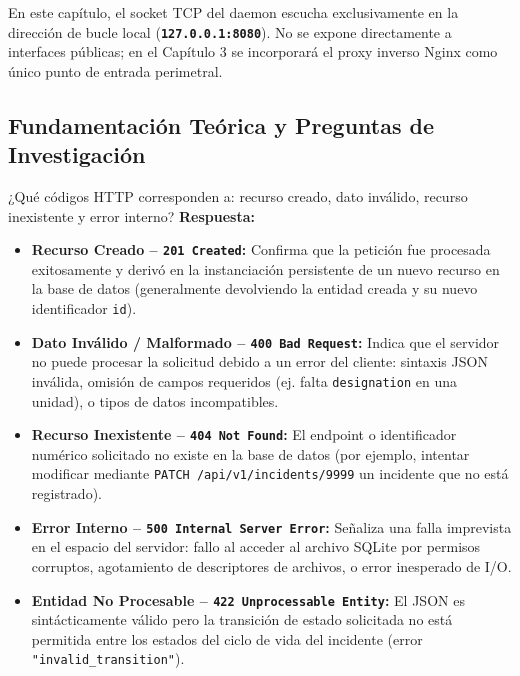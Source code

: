 \documentclass[10pt,a4paper]{article}
\begin{document}
\begin{notabox}
    En este capítulo, el socket TCP del daemon escucha exclusivamente en la dirección de bucle local (\textbf{\texttt{127.0.0.1:8080}}). No se expone directamente a interfaces públicas; en el Capítulo 3 se incorporará el proxy inverso Nginx como único punto de entrada perimetral.
\end{notabox}

\subsection{Fundamentación Teórica y Preguntas de Investigación}

\begin{pregunta}{¿Qué códigos HTTP corresponden a: recurso creado, dato inválido, recurso inexistente y error interno?}
    \textbf{Respuesta:}
    \begin{itemize}[leftmargin=*]
        \item \textbf{Recurso Creado -- \texttt{201 Created}:} Confirma que la petición fue procesada exitosamente y derivó en la instanciación persistente de un nuevo recurso en la base de datos (generalmente devolviendo la entidad creada y su nuevo identificador \texttt{id}).
        \item \textbf{Dato Inválido / Malformado -- \texttt{400 Bad Request}:} Indica que el servidor no puede procesar la solicitud debido a un error del cliente: sintaxis JSON inválida, omisión de campos requeridos (ej. falta \texttt{designation} en una unidad), o tipos de datos incompatibles.
        \item \textbf{Recurso Inexistente -- \texttt{404 Not Found}:} El endpoint o identificador numérico solicitado no existe en la base de datos (por ejemplo, intentar modificar mediante \texttt{PATCH /api/v1/incidents/9999} un incidente que no está registrado).
        \item \textbf{Error Interno -- \texttt{500 Internal Server Error}:} Señaliza una falla imprevista en el espacio del servidor: fallo al acceder al archivo SQLite por permisos corruptos, agotamiento de descriptores de archivos, o error inesperado de I/O.
        \item \textbf{Entidad No Procesable -- \texttt{422 Unprocessable Entity}:} El JSON es sintácticamente válido pero la transición de estado solicitada no está permitida entre los estados del ciclo de vida del incidente (error \texttt{"invalid\_transition"}).
    \end{itemize}
\end{pregunta}
\end{document}
